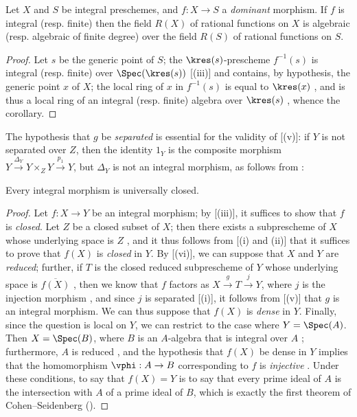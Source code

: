 \begin{corollary}[6.1.8]
\label{II.6.1.8}
Let $X$ and $S$ be integral preschemes, and $f:X\to S$ a \emph{dominant} morphism.
If $f$ is integral (resp. finite) then the field $R(X)$ of rational functions on $X$ is algebraic (resp. algebraic of finite degree) over the field $R(S)$ of rational functions on $S$.
\end{corollary}

\begin{proof}
Let $s$ be the generic point of $S$;
the $\kres(s)$-prescheme $f^{-1}(s)$ is integral (resp. finite) over $\Spec(\kres(s))$ [(iii)] and contains, by hypothesis, the generic point $x$ of $X$;
  the local ring of $x$ in $f^{-1}(s)$ is equal to $\kres(x)$ , and is thus a local ring of an integral (resp. finite) algebra over $\kres(s)$ , whence the corollary.
\end{proof}

\begin{remark}[6.1.9]
\label{II.6.1.9}
The hypothesis that $g$ be \emph{separated} is essential for the validity of [(v)]: if $Y$ is not separated over $Z$, then the identity $1_Y$ is the composite morphism $Y\xrightarrow{\Delta_Y}Y\times_Z Y\xrightarrow{p_1}Y$, but $\Delta_Y$ is not an integral morphism, as follows from :
\end{remark}

\begin{proposition}[6.1.10]
\label{II.6.1.10}
Every integral morphism is universally closed.
\end{proposition}

\begin{proof}
Let $f:X\to Y$ be an integral morphism;
by [(iii)], it suffices to show that $f$ is \emph{closed}.
Let $Z$ be a closed subset of $X$;
then there exists a subprescheme of $X$ whose underlying space is $Z$ , and it thus follows from [(i) and (ii)] that it suffices to prove that $f(X)$ is \emph{closed} in $Y$.
By [(vi)], we can suppose that $X$ and $Y$ are \emph{reduced};
further, if $T$ is the closed reduced subprescheme of $Y$ whose underlying space is $\overline{f(X)}$ , then we know that $f$ factors as $X\xrightarrow{g}T\xrightarrow{j}Y$, where $j$ is the injection morphism , and since $j$ is separated [(i)], it follows from [(v)] that $g$ is an integral morphism.
We can thus suppose that $f(X)$ is \emph{dense} in $Y$.
Finally, since the question is local on $Y$, we can restrict to the case where $Y=\Spec(A)$.
Then $X=\Spec(B)$, where $B$ is an $A$-algebra that is integral over $A$ ;
furthermore, $A$ is reduced , and the hypothesis that $f(X)$ be dense in $Y$ implies that the homomorphism $\vphi:A\to B$ corresponding to $f$ is \emph{injective} .
Under these conditions, to say that $f(X)=Y$ is to say that every prime ideal of $A$ is the intersection with $A$ of a prime ideal of $B$, which is exactly the first theorem of Cohen--Seidenberg (\cite[t.~I, p.~257, th.~3]{I-13}).
\end{proof}

